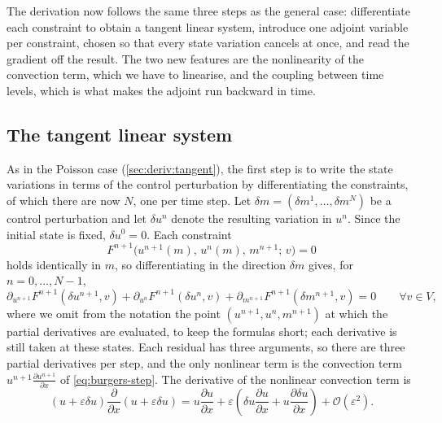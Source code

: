 \documentclass[a4paper,11pt]{article}
\theoremstyle{spacedplain} \newtheorem{theorem}[counter]{Theorem} \newtheorem{lemma}[counter]{Lemma} \newtheorem{prop}[counter]{Proposition} \newtheorem{cor}[counter]{Corollary}
\theoremstyle{spaceddefinition} \newtheorem{defn}[counter]{Definition} \newtheorem{example}[counter]{Example} \newtheorem{remark}[counter]{Remark}
\begin{document}
The derivation now follows the same three steps as the general case: differentiate each constraint to obtain a tangent linear system, introduce one adjoint variable per constraint, chosen so that every state variation cancels at once, and read the gradient off the result. The two new features are the nonlinearity of the convection term, which we have to linearise, and the coupling between time levels, which is what makes the adjoint run backward in time.

\subsection{The tangent linear system}
\label{sec:burgers-deriv:tlm}

As in the Poisson case (\cref{sec:deriv:tangent}), the first step is to write the state variations in terms of the control perturbation by differentiating the constraints, of which there are now $N$, one per time step. Let $\delta m = (\delta m^1, \ldots, \delta m^N)$ be a control perturbation and let $\delta u^n$ denote the resulting variation in $u^n$. Since the initial state is fixed, $\delta u^0 = 0$. Each constraint
\begin{equation}
  F^{n+1}\bigl(u^{n+1}(m),\, u^n(m),\, m^{n+1};\, v\bigr) = 0
\end{equation}
holds identically in $m$, so differentiating in the direction $\delta m$ gives, for $n = 0, \ldots, N - 1$,
\begin{equation}
  \label{eq:burgers-tlm}
  \partial_{u^{n+1}} F^{n+1}(\delta u^{n+1}, v)
  + \partial_{u^n} F^{n+1}(\delta u^n, v)
  + \partial_{m^{n+1}} F^{n+1}(\delta m^{n+1}, v)
  = 0
  \qquad \forall v \in V,
\end{equation}
where we omit from the notation the point $(u^{n+1}, u^n, m^{n+1})$ at which the partial derivatives are evaluated, to keep the formulas short; each derivative is still taken at these states. Each residual has three arguments, so there are three partial derivatives per step, and the only nonlinear term is the convection term $u^{n+1} \frac{\partial u^{n+1}}{\partial x}$ of \cref{eq:burgers-step}. The derivative of the nonlinear convection term is
\begin{equation}
  \label{eq:burgers-conv-lin}
  (u + \varepsilon \delta u)
  \frac{\partial}{\partial x}(u + \varepsilon \delta u)
  = u \frac{\partial u}{\partial x}
  + \varepsilon
    \left(
      \delta u \frac{\partial u}{\partial x}
      + u \frac{\partial \delta u}{\partial x}
    \right)
  + \mathcal{O}(\varepsilon^{2}).
\end{equation}
\end{document}
